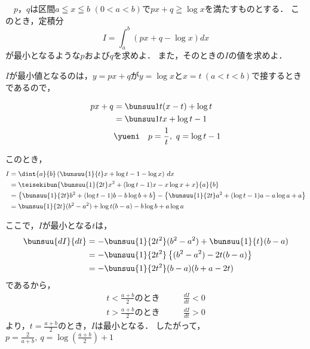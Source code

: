 \begin{problem}
  　$p$，$q$は区間$a \leqq x \leqq b$ $(0<a<b)$で$px+q\geqq\log x$を満たすものとする．
このとき，定積分
\[ I=\int_a^b(px+q-\log x)dx \]
が最小となるような$p$および$q$を求めよ．
また，そのときの$I$の値を求めよ．
\end{problem}



$I$が最小値となるのは，$y = px + q$が$y = \log x$と$x=t\ (a<t<b)$で接するときであるので，

\begin{align*}
  px+q &= \bunsuu1{t}(x-t) + \log t\\
  &= \bunsuu1{t}x + \log t - 1 \\
  &\yueni\quad p = \frac1{t},\ q = \log t -1
\end{align*}

このとき，
\begin{align*}
  I &= \dint{a}{b}\left(\bunsuu{1}{t}x + \log t - 1 - \log x\right)\,dx \\
  &= \teisekibun{\bunsuu{1}{2t}x^2 + (\log t - 1)x - x\log x + x}{a}{b} \\
  &= \left\{\bunsuu{1}{2t}b^2 + (\log t -1)b - b\log b + b\right\}
  -\left\{\bunsuu{1}{2t}a^2 + (\log t - 1)a - a\log a + a\right\} \\
  &= \bunsuu{1}{2t}(b^2-a^2) + \log t(b-a) - b\log b + a\log a\\
\end{align*}

ここで，$I$が最小となる$t$は，
\begin{align*}
  \bunsuu{dI}{dt} &= -\bunsuu{1}{2t^2}(b^2-a^2) + \bunsuu{1}{t}(b-a) \\
  &= -\bunsuu{1}{2t^2}\left\{(b^2-a^2) - 2t(b-a)\right\} \\
  &= -\bunsuu{1}{2t^2}(b-a)(b+a-2t)
\end{align*}
であるから，
\begin{align*}
  t < \frac{a+b}{2} のとき \qquad&\frac{dI}{dt} < 0\\
  t > \frac{a+b}{2} のとき \qquad&\frac{dI}{dt} > 0
\end{align*}
より，$t = \frac{a+b}{2}$のとき，$I$は最小となる．
したがって，$p = \frac{2}{a+b},\ q = \log \left(\frac{a+b}{2}\right) + 1$


